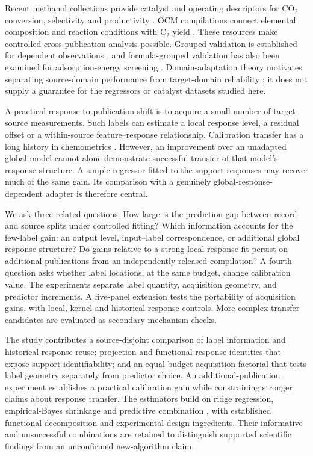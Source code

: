 \documentclass[11pt]{article}
\begin{document}
Recent methanol collections provide catalyst and operating descriptors for CO$_2$ conversion, selectivity and productivity \cite{toldy,yan,suvarna}. OCM compilations connect elemental composition and reaction conditions with C$_2$ yield \cite{schmack,mine}. These resources make controlled cross-publication analysis possible. Grouped validation is established for dependent observations \cite{roberts}, and formula-grouped validation has also been examined for adsorption-energy screening \cite{wu}. Domain-adaptation theory motivates separating source-domain performance from target-domain reliability \cite{bendavid}; it does not supply a guarantee for the regressors or catalyst datasets studied here.

A practical response to publication shift is to acquire a small number of target-source measurements. Such labels can estimate a local response level, a residual offset or a within-source feature--response relationship. Calibration transfer has a long history in chemometrics \cite{feudale}. However, an improvement over an unadapted global model cannot alone demonstrate successful transfer of that model's response structure. A simple regressor fitted to the support responses may recover much of the same gain. Its comparison with a genuinely global-response-dependent adapter is therefore central.

We ask three related questions. How large is the prediction gap between record and source splits under controlled fitting? Which information accounts for the few-label gain: an output level, input--label correspondence, or additional global response structure? Do gains relative to a strong local response fit persist on additional publications from an independently released compilation? A fourth question asks whether label locations, at the same budget, change calibration value. The experiments separate label quantity, acquisition geometry, and predictor increments. A five-panel extension tests the portability of acquisition gains, with local, kernel and historical-response controls. More complex transfer candidates are evaluated as secondary mechanism checks.

The study contributes a source-disjoint comparison of label information and historical response reuse; projection and functional-response identities that expose support identifiability; and an equal-budget acquisition factorial that tests label geometry separately from predictor choice. An additional-publication experiment establishes a practical calibration gain while constraining stronger claims about response transfer. The estimators build on ridge regression, empirical-Bayes shrinkage and predictive combination \cite{efron,breiman}, with established functional decomposition and experimental-design ingredients. Their informative and unsuccessful combinations are retained to distinguish supported scientific findings from an unconfirmed new-algorithm claim.
\end{document}
